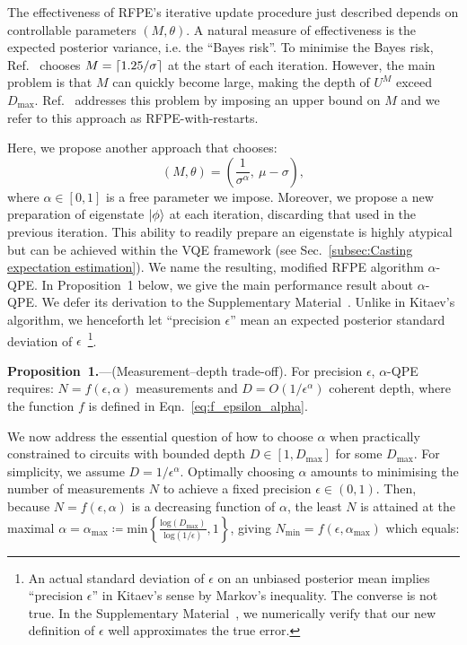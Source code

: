 \documentclass[twocolumn,
 reprint,
 amsmath,amssymb,
 aps,
 floatfix,
superscriptaddress
]{revtex4-1}
\DeclarePairedDelimiter{\ceil}{\lceil}{\rceil}
\begin{document}
The effectiveness of RFPE's iterative update procedure just described depends on controllable parameters $(M,\theta)$. A natural measure of effectiveness is the expected posterior variance, i.e. the ``Bayes risk''. To minimise the Bayes risk, Ref.~\cite{Wiebe2016} chooses $M=\ceil{1.25/\sigma}$ at the start of each iteration. However, the main problem is that $M$ can quickly become large, making the depth of $U^{M}$ exceed $D_{\text{max}}$. Ref.~\cite{Wiebe2015} addresses this problem by imposing an upper bound on $M$ and we refer to this approach as RFPE-with-restarts. 

Here, we propose another approach that chooses: 
\begin{equation}\label{eq:m_and_theta}
(M,\theta)= \left( \frac{1}{\sigma^\alpha}, \ \mu-\sigma \right),
\end{equation}
where $\alpha\in[0,1]$ is a free parameter we impose. 
Moreover, we propose a new preparation of eigenstate $\Ket{\phi}$ at each iteration, discarding that used in the previous iteration. This ability to readily prepare an eigenstate is highly atypical but can be achieved within the VQE framework (see Sec.~\ref{subsec:Casting expectation estimation}). 
We name the resulting, modified RFPE algorithm $\alpha$-QPE. In Proposition~1 below, we give the main performance result about $\alpha$-QPE. We defer its derivation to the Supplementary Material~\cite{SuppMat}. Unlike in Kitaev's algorithm, we henceforth let ``precision $\epsilon$'' mean an expected posterior standard deviation of $\epsilon$~\footnote{An actual standard deviation of $\epsilon$ on an unbiased posterior mean implies ``precision $\epsilon$'' in Kitaev's sense by Markov's inequality. The converse is not true. In the Supplementary Material~\cite{SuppMat}, we numerically verify that our new definition of $\epsilon$ well approximates the true error.}.

\vspace{2 mm}
\textbf{Proposition~1.}---(Measurement--depth trade-off). For precision $\epsilon$, $\alpha$-QPE requires: $N = f(\epsilon,\alpha)$ measurements and $D =O(1/\epsilon^{\alpha})$ coherent depth, where the function $f$ is defined in Eqn.~\ref{eq:f_epsilon_alpha}.
\vspace{2 mm}

We now address the essential question of how to choose $\alpha$ when practically constrained to circuits with bounded depth $D\in[1,D_{\text{max}}]$ for some $D_\text{max}$. For simplicity, we assume $D=1/\epsilon^\alpha$. Optimally choosing $\alpha$ amounts to minimising the number of measurements $N$ to achieve a fixed precision $\epsilon\in(0,1)$. Then, because
$N=f(\epsilon,\alpha)$ is a decreasing function
of $\alpha$, the least $N$ is attained at the maximal $\alpha=\alpha_{\text{max}}\coloneqq\text{min}\left\{\frac{\text{log}(D_{\text{max}})}{\text{log}(1/\epsilon)},1\right\}$,
giving $N_{\text{min}} = f(\epsilon, \alpha_{\text{max}})$ which equals:
\end{document}
